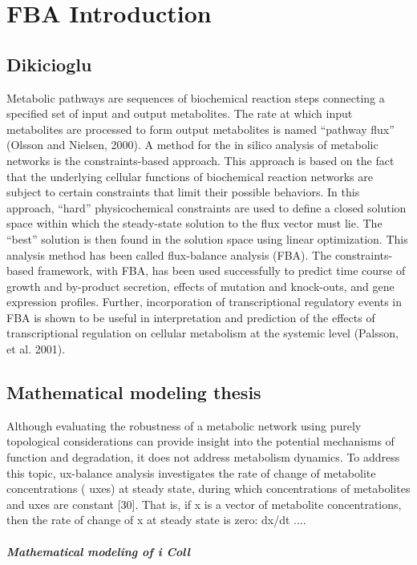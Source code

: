 
\section{FBA Introduction}

\subsection{Dikicioglu}
Metabolic pathways are sequences of biochemical reaction steps connecting a
specified set of input and output metabolites. The rate at which input metabolites are
processed to form output metabolites is named “pathway flux” (Olsson and Nielsen, 2000).
A method for the in silico analysis of metabolic networks is the constraints-based
approach. This approach is based on the fact that the underlying cellular functions of
biochemical reaction networks are subject to certain constraints that limit their possible
behaviors. In this approach, “hard” physicochemical constraints are used to define a closed
solution space within which the steady-state solution to the flux vector must lie. The “best''
solution is then found in the solution space using linear optimization. This analysis method
has been called flux-balance analysis (FBA). The constraints-based framework, with FBA,
has been used successfully to predict time course of growth and by-product secretion,
effects of mutation and knock-outs, and gene expression profiles. Further, incorporation of
transcriptional regulatory events in FBA is shown to be useful in interpretation and
prediction of the effects of transcriptional regulation on cellular metabolism at the systemic
level (Palsson, et al. 2001).

\subsection{Mathematical modeling thesis}
Although evaluating the robustness of a metabolic network using purely topological considerations can provide insight into the potential mechanisms of function and degradation, it does not address metabolism dynamics. To address this topic,  ux-balance analysis investigates the rate of change of metabolite concentrations ( uxes) at steady state, during which concentrations of metabolites and  uxes are constant [30]. That is, if x is a vector of metabolite concentrations, then the rate of change of x at steady state is zero: dx/dt ....

\subparagraph{Mathematical modeling of i Coll}

